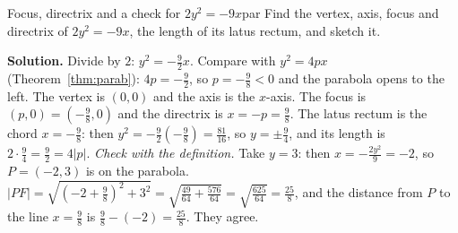 \documentclass[11pt]{article}
\begin{document}
\begin{exmp}{Focus, directrix and a check for $2y^2=-9x$}{par}
Find the vertex, axis, focus and directrix of $2y^2=-9x$, the length of its latus rectum, and sketch it.

\textbf{Solution.} Divide by $2$: $y^2=-\frac92x$. Compare with $y^2=4px$ (Theorem~\ref{thm:parab}): $4p=-\frac92$, so $p=-\frac98<0$ and the parabola opens to the left. The vertex is $(0,0)$ and the axis is the $x$-axis. The focus is $(p,0)=\left(-\frac98,0\right)$ and the directrix is $x=-p=\frac98$. The latus rectum is the chord $x=-\frac98$: then $y^2=-\frac92\left(-\frac98\right)=\frac{81}{16}$, so $y=\pm\frac94$, and its length is $2\cdot\frac94=\frac92=4\lvert p\rvert$.
\emph{Check with the definition.} Take $y=3$: then $x=-\frac{2y^2}9=-2$, so $P=(-2,3)$ is on the parabola. $\lvert PF\rvert=\sqrt{\left(-2+\frac98\right)^2+3^2}=\sqrt{\frac{49}{64}+\frac{576}{64}}=\sqrt{\frac{625}{64}}=\frac{25}8$, and the distance from $P$ to the line $x=\frac98$ is $\frac98-(-2)=\frac{25}8$. They agree.


\end{exmp}
\end{document}
